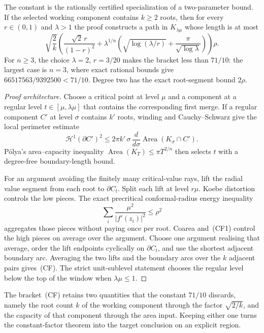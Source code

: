 \documentclass[11pt]{article}
\begin{document}
The constant is the rationally certified specialization of a two-parameter
bound.  If the selected working component contains $k\ge2$ roots, then for
every $r\in(0,1)$ and $\lambda>1$ the proof constructs a path in
$K_{\lambda\mu}$ whose length is at most
\[
 \sqrt{\frac2k}\left(
   \frac{\sqrt2\,r}{(1-r)^2}
   +\lambda^{1/n}\left(
      \sqrt{\log(\lambda/r)}+
      \frac{\pi}{\sqrt{\log\lambda}}
    \right)
 \right)\rho.                                      \tag{CF}
\]
For $n\ge3$, the choice $\lambda=2$, $r=3/20$ makes the bracket less
than $71/10$: the largest case is $n=3$, where exact rational bounds give
$66517563/9392500<71/10$.  Degree two has the exact root-segment bound
$2\rho$.

\begin{proof}[Proof architecture]
Choose a critical point at level $\mu$ and a component at a regular level
$t\in[\mu,\lambda\mu]$ that contains the corresponding first merge.  If a
regular component $C'$ at level $\sigma$ contains $k'$ roots, winding and
Cauchy--Schwarz give the local perimeter estimate
\[
 \mathcal H^1(\partial C')^2
 \le2\pi k'\,\sigma\,\frac{d}{d\sigma}
      \operatorname{Area}(K_\sigma\cap C').         \tag{CF1}
\]
P\'olya's area--capacity inequality
$\operatorname{Area}(K_T)\le\pi T^{2/n}$ then selects $t$ with a
degree-free boundary-length bound.

For an argument avoiding the finitely many critical-value rays, lift the
radial value segment from each root to $\partial C_t$.  Split each lift at
level $r\mu$.  Koebe distortion controls the low pieces.  The exact
precritical conformal-radius energy inequality
\[
 \sum_i\frac{\mu^2}{|f'(z_i)|^2}\le\rho^2          \tag{CF2}
\]
aggregates those pieces without paying once per root.  Coarea and~(CF1)
control the high pieces on average over the argument.  Choose one argument
realising that average, order the lift endpoints cyclically on
$\partial C_t$, and use the shortest adjacent boundary arc.  Averaging the
two lifts and the boundary arcs over the $k$ adjacent pairs gives~(CF).
The strict unit-sublevel statement chooses the regular level below the top of
the window when $\lambda\mu\le1$.
\end{proof}

The bracket~(CF) retains two quantities that the constant $71/10$ discards,
namely the root count $k$ of the working component through the factor
$\sqrt{2/k}$, and the capacity of that component through the area input.
Keeping either one turns the constant-factor theorem into the target
conclusion on an explicit region.
\end{document}
